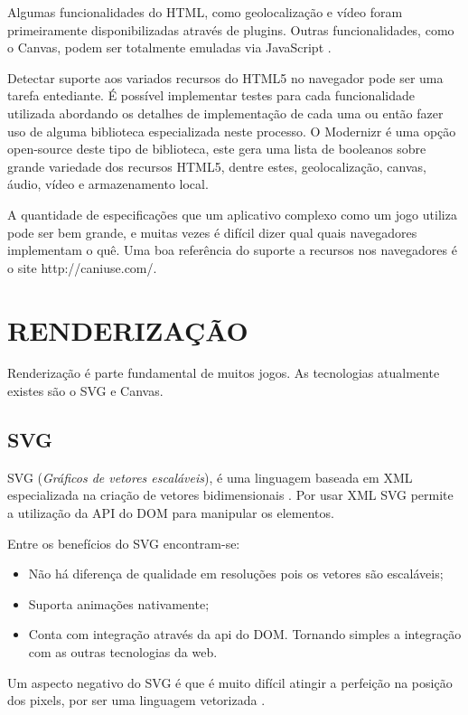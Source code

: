 Algumas funcionalidades do HTML, como geolocalização e vídeo
foram primeiramente disponibilizadas através de plugins. Outras
funcionalidades, como o Canvas, podem ser totalmente emuladas via
JavaScript \autocite{diveIntohtml}.

Detectar suporte aos variados recursos do HTML5 no navegador
pode ser uma tarefa entediante. É possível implementar testes para
cada funcionalidade utilizada abordando os detalhes de implementação
de cada uma ou então fazer uso de alguma biblioteca especializada
neste processo. O Modernizr é uma opção open-source deste tipo de
biblioteca, este gera uma lista de booleanos sobre grande variedade dos
recursos HTML5, dentre estes, geolocalização, canvas, áudio, vídeo e
armazenamento local.

A quantidade de especificações que um aplicativo complexo como um jogo
utiliza pode ser bem grande, e muitas vezes é difícil dizer qual quais
navegadores implementam o quê. Uma boa referência do suporte a recursos
nos navegadores é o site http://caniuse.com/.

\section{RENDERIZAÇÃO}

Renderização é parte fundamental de muitos jogos. As tecnologias atualmente existes são o SVG e Canvas.

\subsection{SVG}
SVG (\textit{Gráficos de vetores escaláveis}), é uma linguagem
baseada em XML especializada na criação de vetores bidimensionais
\autocite{html5mostwanted}. Por usar XML SVG permite a utilização da
API do DOM para manipular os elementos.

Entre os benefícios do SVG encontram-se:
\begin{itemize}
\item Não há diferença de qualidade em resoluções pois os vetores são escaláveis;
\item Suporta animações nativamente;
\item Conta com integração através da api do DOM. Tornando simples a integração com as outras tecnologias da web.
\end{itemize}

Um aspecto negativo do SVG é que é muito difícil atingir a
perfeição na posição dos pixels, por ser uma linguagem vetorizada
\autocite{html5mostwanted}.

